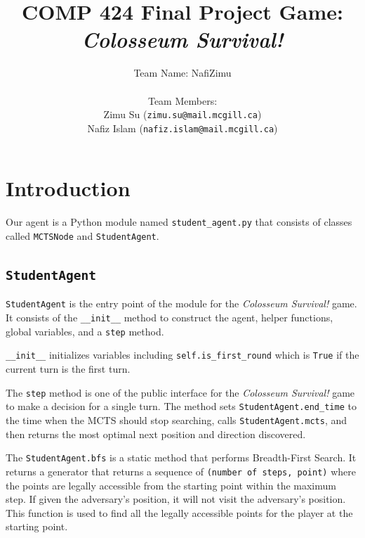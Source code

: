 \documentclass[twoside,11pt]{article}
\begin{document}
\title{COMP 424 Final Project Game: \textit{Colosseum Survival!}}
\author{Team Name: NafiZimu\\\\Team Members: \\Zimu Su (\texttt{zimu.su@mail.mcgill.ca}) \\Nafiz Islam (\texttt{nafiz.islam@mail.mcgill.ca})}

\maketitle

\section{Introduction}

Our agent is a Python module named \texttt{student\_agent.py} that consists of classes called \texttt{MCTSNode} and \texttt{StudentAgent}.

\subsection{\texttt{StudentAgent}}

\texttt{StudentAgent} is the entry point of the module for the \textit{Colosseum Survival!} game.
It consists of the \texttt{\_\_init\_\_} method to construct the agent, helper functions, global variables, and a \texttt{step} method.

\texttt{\_\_init\_\_} initializes variables including \texttt{self.is\_first\_round} which is \texttt{True} if the current turn is the first turn.

The \texttt{step} method is one of the public interface for the \textit{Colosseum Survival!} game to make a decision for a single turn.
The method sets \texttt{StudentAgent.end\_time} to the time when the MCTS should stop searching, calls \texttt{StudentAgent.mcts}, and then returns the most optimal next position and direction discovered.

The \texttt{StudentAgent.bfs} is a static method that performs Breadth-First Search.
It returns a generator that returns a sequence of \texttt{(number of steps, point)} where the points are legally accessible from the starting point within the maximum step.
If given the adversary's position, it will not visit the adversary's position.
This function is used to find all the legally accessible points for the player at the starting point.
\end{document}
